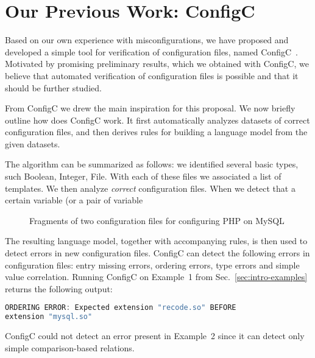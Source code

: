 \section{Our Previous Work: ConfigC}
\label{sec:prelim}

Based on our own experience with misconfigurations,
we have proposed and developed a simple tool for verification of 
configuration files, named
ConfigC~\cite{santolucitoCAV}. Motivated by promising preliminary
results, which we obtained with ConfigC, we believe that automated 
verification of configuration files is possible and that it should be further studied.

From ConfigC we drew the main inspiration for this proposal. We now briefly
outline how does ConfigC work. It first automatically
analyzes datasets of correct configuration files, 
and then derives rules for building a language model 
from the given datasets.

The algorithm can be summarized as follows: we identified several basic types, 
such Boolean, Integer, File. With each of these files we associated a list 
of templates. We then analyze {\emph {correct}} configuration files. When we 
detect that a certain variable (or a pair of variable


\begin{figure}
	\centering
\begin{minipage}{0.9\textwidth}
\begin{parcolumns}{2}


\colplacechunks
\end{parcolumns}
\end{minipage}
	\caption{Fragments of two configuration files for configuring PHP on MySQL}
\end{figure}


The resulting language model, together with accompanying rules, 
is then used to detect errors in new configuration files.
ConfigC can detect the following errors in configuration files:
entry missing errors, ordering errors, type errors and
simple value correlation. Running ConfigC on Example~1 from 
Sec.~\ref{sec:intro-examples} returns the following output:
\begin{lstlisting}[language=C, xleftmargin=.01\textwidth]
ORDERING ERROR: Expected extension "recode.so" BEFORE 
extension "mysql.so"
\end{lstlisting} 
ConfigC could not detect an error present in Example~2 since it can detect 
only simple comparison-based relations.


